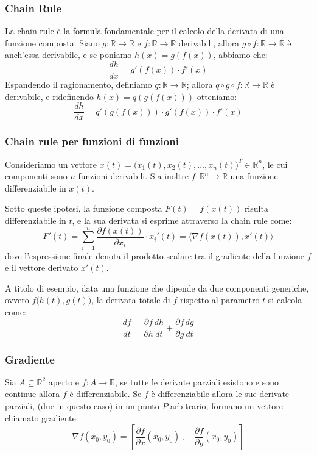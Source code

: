 \subsubsection{Chain Rule}
La chain rule è la formula fondamentale per il calcolo della derivata di una funzione composta. Siano $g:\mathbb{R}\to\mathbb{R}$ e $f:\mathbb{R}\to\mathbb{R}$ derivabili, allora $g\circ f:\mathbb{R}\to\mathbb{R}$ è anch'essa derivabile, e se poniamo $h(x)=g(f(x))$, abbiamo che:
\[
\frac{dh}{dx}=g'(f(x))\cdot f'(x)
\]
Espandendo il ragionamento, definiamo $q:\mathbb{R}\to\mathbb{R}$; allora $q\circ g\circ f:\mathbb{R}\to\mathbb{R}$ è derivabile, e ridefinendo $h(x)=q(g(f(x)))$ otteniamo:
\[
\frac{dh}{dx}=q'(g(f(x)))\cdot g'(f(x))\cdot f'(x)
\]

\subsubsection{Chain rule per funzioni di funzioni}

Consideriamo un vettore $x(t)=\big(x_1(t),x_2(t),\dots, x_n(t)\big)^T\in\mathbb{R}^n$, le cui componenti sono $n$ funzioni derivabili. Sia inoltre $f:\mathbb{R}^n \to\mathbb{R}$ una funzione differenziabile in $x(t)$.

Sotto queste ipotesi, la funzione composta $F(t) = f(x(t))$ risulta differenziabile in $t$, e la sua derivata si esprime attraverso la chain rule come:
\[
F'(t)=\sum_{i=1}^{n}\frac{\partial f(x(t))}{\partial x_i} \cdot x_i'(t)=\langle\nabla f(x(t)),x'(t)\rangle
\]
dove l'espressione finale denota il prodotto scalare tra il gradiente della funzione $f$ e il vettore derivato $x'(t)$.

A titolo di esempio, data una funzione che dipende da due componenti generiche, ovvero $f\big(h(t), g(t)\big)$, la derivata totale di $f$ rispetto al parametro $t$ si calcola come:
\[
\frac{df}{dt} = \frac{\partial f}{\partial h} \frac{dh}{dt} + \frac{\partial f}{\partial g} \frac{dg}{dt}
\]

\subsubsection{Gradiente}
Sia $A\subseteq\mathbb{R}^2$ aperto e $f:A\to\mathbb{R}$, se tutte le derivate parziali esistono e sono continue allora $f$ è differenziabile. Se $f$ è differenziabile allora le sue derivate parziali, (due in questo caso) in un punto $P$ arbitrario, formano un vettore chiamato gradiente:
\[
\nabla f(x_0,y_0)=\left[\frac{\partial f}{\partial x}(x_0,y_0)\,, \quad\frac{\partial f}{\partial y}(x_0,y_0)\right]
\]

